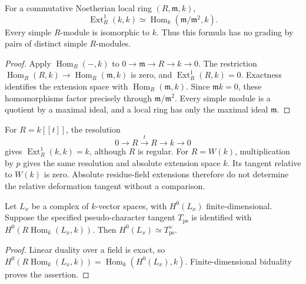 \begin{proposition}
\label{v4-arith:w10-b:prop:block-ext-ps}
For a commutative Noetherian local ring \((R,\mathfrak m,k)\),
\begin{equation}
\label{v4-arith:w10-b:eq:block-ext-ps}
 \operatorname{Ext}^1_R(k,k)\simeq
 \operatorname{Hom}_k(\mathfrak m/\mathfrak m^2,k).
\end{equation}
Every simple \(R\)-module is isomorphic to \(k\). Thus this formula
has no grading by pairs of distinct simple \(R\)-modules.
\end{proposition}
\begin{proof}
Apply \(\operatorname{Hom}_R(-,k)\) to
\(0\to\mathfrak m\to R\to k\to0\).
The restriction \(\operatorname{Hom}_R(R,k)\to
\operatorname{Hom}_R(\mathfrak m,k)\) is zero, and
\(\operatorname{Ext}^1_R(R,k)=0\). Exactness identifies the extension
space with \(\operatorname{Hom}_R(\mathfrak m,k)\).
Since \(\mathfrak m k=0\), these homomorphisms factor precisely through
\(\mathfrak m/\mathfrak m^2\). Every simple module is a quotient by
a maximal ideal, and a local ring has only the maximal ideal \(\mathfrak m\).
\end{proof}

\begin{example}
For \(R=k[[t]]\), the resolution
\[
 0\longrightarrow R\xrightarrow{\ t\ }R\longrightarrow k
 \longrightarrow0
\]
gives \(\operatorname{Ext}^1_R(k,k)=k\), although \(R\) is regular.
For \(R=W(k)\), multiplication by \(p\) gives the same resolution
and absolute extension space \(k\). Its tangent relative to
\(W(k)\) is zero. Absolute residue-field extensions therefore do
not determine the relative deformation tangent without a comparison.
\end{example}

\begin{proposition}
\label{v4-arith:w10-b:prop:spectral-ps}
Let \(L_x\) be a complex of \(k\)-vector spaces, with
\(H^0(L_x)\) finite-dimensional. Suppose the specified
pseudo-character tangent \(T_{\mathrm{ps}}\) is identified with
\(H^0(R\operatorname{Hom}_k(L_x,k))\). Then
\(H^0(L_x)\simeq T_{\mathrm{ps}}^\vee\).
\end{proposition}
\begin{proof}
Linear duality over a field is exact, so
\(H^0(R\operatorname{Hom}_k(L_x,k))=
\operatorname{Hom}_k(H^0(L_x),k)\).
Finite-dimensional biduality proves the assertion.
\end{proof}

